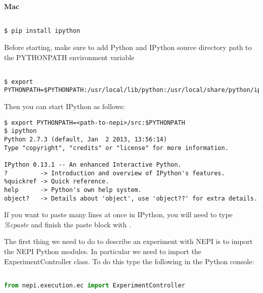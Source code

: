\endgroup

\textbf{Mac}\\

\begingroup
    \fontsize{10pt}{12pt}\selectfont

\begin{verbatim}

$ pip install ipython

\end{verbatim}

\endgroup

Before starting, make sure to add Python and IPython source directory 
path to the PYTHONPATH environment variable

\begingroup
    \fontsize{10pt}{12pt}\selectfont

\begin{verbatim}

$ export PYTHONPATH=$PYTHONPATH:/usr/local/lib/python:/usr/local/share/python/ipython

\end{verbatim}

\endgroup

Then you can start IPython as follows: 

\begin{verbatim}
$ export PYTHONPATH=<path-to-nepi>/src:$PYTHONPATH
$ ipython
Python 2.7.3 (default, Jan  2 2013, 13:56:14) 
Type "copyright", "credits" or "license" for more information.

IPython 0.13.1 -- An enhanced Interactive Python.
?         -> Introduction and overview of IPython's features.
%quickref -> Quick reference.
help      -> Python's own help system.
object?   -> Details about 'object', use 'object??' for extra details.

\end{verbatim}

If you want to paste many lines at once in IPython, you will need 
to type \emph{\%cpaste} and finish the paste block with \emph{\-\-}.

The first thing we need to do to describe an experiment with NEPI 
is to import the NEPI Python modules. 
In particular we need to import the ExperimentController class. 
To do this type the following in the Python console: 

\begin{lstlisting}[language=Python]

from nepi.execution.ec import ExperimentController

\end{lstlisting}


